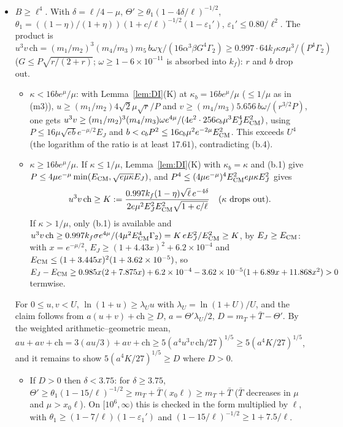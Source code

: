 \begin{itemize}
Both contradict (b.4).
\item[(b.6)] $B\ge\ell^4$. With $\delta=\ell/4-\mu$, $\Theta'\ge\theta_1(1-4\delta/\ell)^{-1/2}$, $\theta_1=((1-\eta)/(1+\eta))(1+c/\ell)^{-1/2}(1-\varepsilon_1')$, $\varepsilon_1'\le0.80/\ell^2$.
The product is
$u^3v\,\mathrm{ch}=(m_1/m_2)^3(m_4/m_3)m_5\,b\omega\chi/(16\alpha^3\beta G^4\Gamma_2)\ge0.997\cdot64k_f\kappa\sigma\mu^3/(P^4\Gamma_2)$ ($G\le P\sqrt{r/(2+r)}$; $\omega\ge1-6\times10^{-11}$ is absorbed into $k_f$): $r$ and $b$ drop out.
\begin{itemize}
\item[($\beta$)] $\kappa<16be^\mu/\mu$: with Lemma~\ref{lem:DI}(K) at $\kappa_b=16be^\mu/\mu$ ($\le1/\mu$ as in (m3)), $u\ge(m_1/m_2)4\sqrt2\mu\sqrt r/P$ and $v\ge(m_4/m_3)5.656\,b\omega/(r^{3/2}P)$, one gets $u^3v\ge(m_1/m_2)^3(m_4/m_3)\omega e^{4\mu}/(4e^2\cdot256c_b\mu^3E_J^4E_{\rm CM}^2)$, using $P\le16\mu\sqrt{eb}e^{-\mu/2}E_J$ and $b<c_bP^2\le16c_b\mu^2e^{-2\mu}E_{\rm CM}^2$. This exceeds $U^4$ (the logarithm of the ratio is at least $17.61$), contradicting (b.4).
\item[($\alpha$)] $\kappa\ge16be^\mu/\mu$. If $\kappa\le1/\mu$, Lemma~\ref{lem:DI}(K) with $\kappa_b=\kappa$ and (b.1) give $P\le4\mu e^{-\mu}\min(E_{\rm CM},\sqrt{e\mu\kappa}E_J)$, and $P^4\le(4\mu e^{-\mu})^4E_{\rm CM}^2e\mu\kappa E_J^2$ gives
\begin{equation}
u^3v\,\mathrm{ch}\ge K:=\frac{0.997k_f(1-\eta)\sqrt\ell\,e^{-4\delta}}{2e\mu^2E_J^2E_{\rm CM}^2\sqrt{1+c/\ell}}\quad(\kappa\text{ drops out}).
\end{equation}
If $\kappa>1/\mu$, only (b.1) is available and $u^3v\,\mathrm{ch}\ge0.997k_f\sigma e^{4\mu}/(4\mu^2E_{\rm CM}^4\Gamma_2)=K\,eE_J^2/E_{\rm CM}^2\ge K$, by $E_J\ge E_{\rm CM}$:
with $x=e^{-\mu/2}$, $E_J\ge(1+4.43x)^2+6.2\times10^{-4}$ and $E_{\rm CM}\le(1+3.445x)^2(1+3.62\times10^{-5})$, so $E_J-E_{\rm CM}\ge0.985x(2+7.875x)+6.2\times10^{-4}-3.62\times10^{-5}(1+6.89x+11.868x^2)>0$ termwise.
\end{itemize}
For $0\le u,v<U$, $\ln(1+u)\ge\lambda_Uu$ with $\lambda_U=\ln(1+U)/U$, and the claim follows from $a(u+v)+\mathrm{ch}\ge D$, $a=\Theta'\lambda_U/2$, $D=m_T+\bar T-\Theta'$.
By the weighted arithmetic--geometric mean,
$au+av+\mathrm{ch}=3(au/3)+av+\mathrm{ch}\ge5(a^4u^3v\,\mathrm{ch}/27)^{1/5}\ge5(a^4K/27)^{1/5}$,
and it remains to show $5(a^4K/27)^{1/5}\ge D$ where $D>0$.
\begin{itemize}
\item[(N0)] If $D>0$ then $\delta<3.75$: for $\delta\ge3.75$, $\Theta'\ge\theta_1(1-15/\ell)^{-1/2}\ge m_T+\bar T(x_0\ell)\ge m_T+\bar T$ ($\bar T$ decreases in $\mu$ and $\mu>x_0\ell$). On $[10^6,\infty)$ this is checked in the form multiplied by $\ell$, with $\theta_1\ge(1-7/\ell)(1-\varepsilon_1')$ and $(1-15/\ell)^{-1/2}\ge1+7.5/\ell$.

\end{itemize}
\end{itemize}
